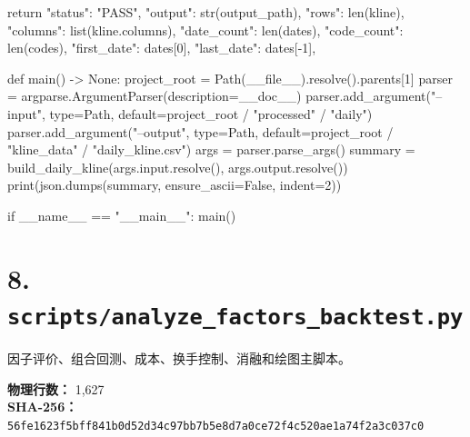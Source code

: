\documentclass[UTF8,a4paper,fontset=fandol]{ctexart}
\begin{document}
\begin{ProjectCode}
    return {
        "status": "PASS",
        "output": str(output_path),
        "rows": len(kline),
        "columns": list(kline.columns),
        "date_count": len(dates),
        "code_count": len(codes),
        "first_date": dates[0],
        "last_date": dates[-1],
    }


def main() -> None:
    project_root = Path(__file__).resolve().parents[1]
    parser = argparse.ArgumentParser(description=__doc__)
    parser.add_argument("--input", type=Path, default=project_root / "processed" / "daily")
    parser.add_argument("--output", type=Path, default=project_root / "kline_data" / "daily_kline.csv")
    args = parser.parse_args()
    summary = build_daily_kline(args.input.resolve(), args.output.resolve())
    print(json.dumps(summary, ensure_ascii=False, indent=2))


if __name__ == "__main__":
    main()
\end{ProjectCode}
\clearpage
\section{8. \texttt{scripts/analyze\_factors\_backtest.py}}
因子评价、组合回测、成本、换手控制、消融和绘图主脚本。

\textbf{物理行数：} 1,627\\
\textbf{SHA-256：} \texttt{56fe1623f5bff841b0d52d34c97bb7b5e8d7a0ce72f4c520ae1a74f2a3c037c0}
\end{document}
